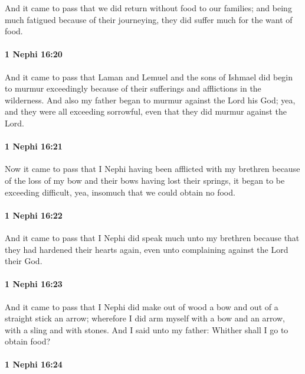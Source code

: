 			And it came to pass that we did return without food to our families;
			and being much fatigued because of their journeying,
			they did suffer much for the want of food.

		\paragraph{1 Nephi 16:20} %
			\label{1NEPHI-16-20}

			And it came to pass that Laman and Lemuel and the sons of Ishmael
			did begin to murmur exceedingly
			because of their sufferings and afflictions in the wilderness.
			And also my father began to murmur against the Lord his God;
			yea, and they were all exceeding sorrowful,
			even that they did murmur against the Lord.

		\paragraph{1 Nephi 16:21} %
			\label{1NEPHI-16-21}

			Now it came to pass that
			I Nephi having been afflicted with my brethren because of the loss of my bow
			and their bows having lost their springs,
			it began to be exceeding difficult,
			yea, insomuch that we could obtain no food.

		\paragraph{1 Nephi 16:22} %
			\label{1NEPHI-16-22}

			And it came to pass that I Nephi did speak much unto my brethren
			because that they had hardened their hearts again,
			even unto complaining against the Lord their God.

		\paragraph{1 Nephi 16:23} %
			\label{1NEPHI-16-23}

			And it came to pass that I Nephi did make out of wood a bow
			and out of a straight stick an arrow;
			wherefore I did arm myself with a bow and an arrow,
			with a sling and with stones.
			And I said unto my father:
			Whither shall I go to obtain food?

		\paragraph{1 Nephi 16:24} %
			\label{1NEPHI-16-24}

